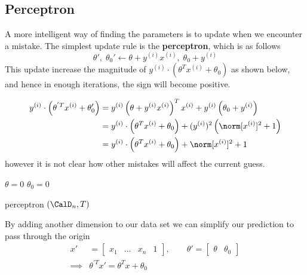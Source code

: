 \subsection{Perceptron}
A more intelligent way of finding the parameters is to update when we encounter a mistake. The simplest update rule is the \textbf{perceptron}, which is as follows
\begin{equation*}
    \theta' ,\; \theta_0' \gets \theta + y^{(i)}x^{(i)} ,\; \theta_0 + y^{(i)}
\end{equation*}
This update increase the magnitude of \(y^{(i)}\cdot(\theta^T x^{(i)} + \theta_0)\) as shown below, and hence in enough iterations, the sign will become positive.

\begin{align*}
    y^{(i)}\cdot  \left( \theta^{'T} x^{(i)} + \theta'_0 \right) &= y^{(i)} \left( \theta + y^{(i)} x^{(i)} \right)^T x^{(i)} + y^{(i)} \left( \theta_0 + y^{(i)} \right)\\
    &= y^{(i)} \cdot \left( \theta^T x^{(i)} + \theta_0 \right) + (y^{(i)})^2 \left( \norm[x^{(i)}]^2 + 1 \right)\\
    &=  y^{(i)} \cdot\left( \theta^T x^{(i)} + \theta_0 \right)+ \norm[x^{(i)}]^2 + 1
\end{align*}
however it is not clear how other mistakes will affect the current guess.

\begin{algorithm}[H] \label{algo:perceptron}
    \DontPrintSemicolon
    $\theta = 0 $\;
    $\theta_0 = 0 $\;

    \caption{ perceptron $(\CalD_n , T )$}
\end{algorithm}


By adding another dimension to our data set we can simplify our prediction to pass through the origin
\begin{align*}
    x'       & = \begin{bmatrix}
        x_1 & \dots & x_n & 1
    \end{bmatrix}, \qquad \theta' = \begin{bmatrix}
        \theta & \theta_0
    \end{bmatrix} \\
    \implies & \theta^{'T} x' = \theta^T x + \theta_0
\end{align*}

